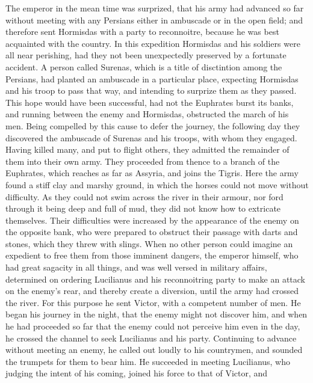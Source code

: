 The emperor in the mean time was surprized, that his army had advanced so far without meeting with any Persians either in ambuscade or in the open field; and therefore sent Hormisdas
with a party to reconnoitre, because he was best acquainted with the country. In this expedition Hormisdas and his soldiers were all near perishing, had they not been unexpectedly preserved by a fortunate accident. A person called Surenas, which is a title of disctintion among the Persians, had planted an ambuscade in a particular place, expecting Hormisdas and his troop to pass that way, and intending to surprize them as they passed. This hope would have been successful, had not the Euphrates burst its banks, and running between the enemy and Hormisdas, obstructed the march of his men. Being compelled by this cause to defer the journey, the following day they discovered the ambuscade of Surenas and his troops, with whom they engaged. Having killed many, and put to flight others, they admitted the remainder of them into their own army. They proceeded from thence to a branch of the Euphrates, which reaches as far as Assyria, and joins the Tigris. Here the army found a stiff clay and marshy ground, in which the horses could not move
without difficulty. As they could not swim across the river in their armour, nor ford through it being deep and full of mud, they did not know how to extricate themselves. Their difficulties were increased by the appearance of the enemy on the opposite bank, who were prepared to obstruct their passage with darts and stones, which they threw with slings. When no other person could imagine an expedient to free them from those imminent dangers, the emperor himself, who had great sagacity in all things, and was well versed in military affairs, determined on ordering Lucilianus and his reconnoitring party to make an attack on the enemy's rear, and thereby create a diversion, until the army had crossed the river. For this purpose he sent Victor, with a competent number of men. He began his journey in the night, that the enemy might not discover him, and when he had proceeded so far that the enemy could not perceive him even in the day, he crossed the channel to seek Lucilianus and his party. Continuing to advance without meeting an enemy, he called out loudly to his countrymen, and sounded the trumpets for them to bear him. He succeeded in meeting Lucilianus, who judging the intent of his coming, joined his force to that of Victor, and
